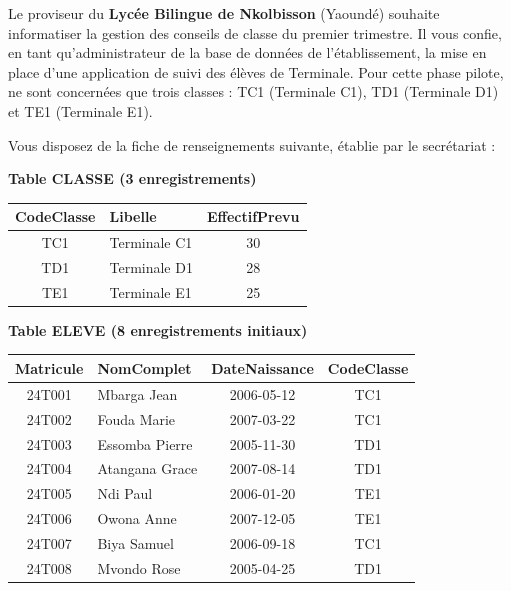 \documentclass[11pt]{article}
\newcommand{\cle}[1]{{\popxbold\color{popdark}#1}}
\newcounter{popsec}
\newcounter{popsub}
\newcommand{\courssub}[1]{%
  \stepcounter{popsub}%
  \par\vspace{9pt}\noindent{\popxbold\fontsize{11.5}{13}\selectfont\color{popink}{\color{poporange}\thepopsec.\thepopsub}\hspace{6pt}#1}\par\nopagebreak\vspace{4pt}
}
\begin{document}
\courssub{Situation}
Le proviseur du \textbf{Lycée Bilingue de Nkolbisson} (Yaoundé) souhaite informatiser la gestion des conseils de classe du premier trimestre. Il vous confie, en tant qu'administrateur de la base de données de l'établissement, la mise en place d'une application de suivi des élèves de Terminale. Pour cette phase pilote, ne sont concernées que trois classes : \cle{TC1} (Terminale C1), \cle{TD1} (Terminale D1) et \cle{TE1} (Terminale E1).

Vous disposez de la fiche de renseignements suivante, établie par le secrétariat :

\medskip
\noindent\textbf{Table \cle{CLASSE} (3 enregistrements)}

\begin{center}
\begin{tabularx}{\linewidth}{|c|X|c|}
\hline
\rowcolor{popblueL}
\textbf{CodeClasse} & \textbf{Libelle} & \textbf{EffectifPrevu} \\
\hline
TC1 & Terminale C1 & 30 \\
TD1 & Terminale D1 & 28 \\
TE1 & Terminale E1 & 25 \\
\hline
\end{tabularx}
\end{center}

\medskip
\noindent\textbf{Table \cle{ELEVE} (8 enregistrements initiaux)}

\begin{center}
\begin{tabularx}{\linewidth}{|c|X|c|c|}
\hline
\rowcolor{popblueL}
\textbf{Matricule} & \textbf{NomComplet} & \textbf{DateNaissance} & \textbf{CodeClasse} \\
\hline
24T001 & Mbarga Jean & 2006-05-12 & TC1 \\
24T002 & Fouda Marie & 2007-03-22 & TC1 \\
24T003 & Essomba Pierre & 2005-11-30 & TD1 \\
24T004 & Atangana Grace & 2007-08-14 & TD1 \\
24T005 & Ndi Paul & 2006-01-20 & TE1 \\
24T006 & Owona Anne & 2007-12-05 & TE1 \\
24T007 & Biya Samuel & 2006-09-18 & TC1 \\
24T008 & Mvondo Rose & 2005-04-25 & TD1 \\
\hline
\end{tabularx}
\end{center}
\end{document}
